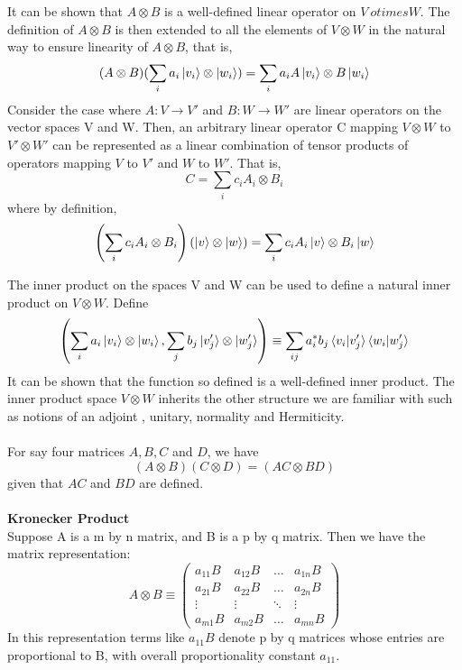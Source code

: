 It can be shown that $A \otimes B$ is a well-defined linear operator on $V\ otimes W$. The definition of $A \otimes B$ is then extended to all the elements of $V \otimes W$ in the natural way to ensure linearity of $A \otimes B$, that is,
\[ (A \otimes B)(\sum_{i} a_{i} \ket{v_i} \otimes \ket{w_i}) = \sum_{i} a_i A\ket{v_i} \otimes B\ket{w_i} \]
Consider the case where $A:V \rightarrow V'$ and $B:W \rightarrow W'$ are linear operators on the vector spaces V and W. Then, 
an arbitrary linear operator C mapping $V \otimes W$ to $V' \otimes W'$ can be represented as a linear combination of tensor products of operators mapping 
$V$ to $V'$ and $W$ to $W'$. That is,
\[ C=\sum_{i} c_{i} A_i \otimes B_i \]
where by definition,
\[ \left( \sum_i c_i A_i \otimes B_i\right) \left(\ket{v} \otimes \ket{w}\right) = \sum_i c_i A_i \ket{v} \otimes B_i \ket{w} \]

The inner product on the spaces V and W can be used to define a natural inner product on $V \otimes W$. Define
\[ \left( \sum_i a_i\ket{v_i}\otimes \ket{w_i}, \sum_j b_j \ket{v'_j} \otimes \ket{w'_j}\right) \equiv \sum_{ij} a_i^*b_j\braket{v_i|v'_j}\braket{w_i|w'_j} \]
It can be shown that the function so defined is a well-defined inner product. The inner product space $V \otimes W$ inherits the other structure we are familiar with such as notions of an adjoint , unitary, normality and Hermiticity.\\
\\
For say four matrices $A,B,C$ and $D$, we have
\[
    (A\otimes B)(C\otimes D)=(AC\otimes BD)
\]
given that $AC$ and $BD$ are defined.\\
\\
\textbf{Kronecker Product}\\
Suppose A is a m by n matrix, and B is a p by q matrix. Then we have the matrix representation:
\[ A \otimes B \equiv \begin{pmatrix} a_{11}B & a_{12}B & \ldots & a_{1n}B \\ a_{21}B & a_{22}B & \ldots & a_{2n}B \\ \vdots & \vdots & \ddots & \vdots \\ a_{m1}B & a_{m2}B & \ldots & a_{mn}B \end{pmatrix} \]
In this representation terms like $a_11B$ denote p by q matrices whose entries are proportional to B, with overall proportionality constant $a_{11}$. 

